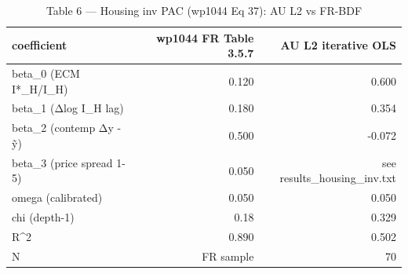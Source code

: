 \begin{table}[ht]
\centering
\caption{Table 6 — Housing inv PAC (wp1044 Eq 37): AU L2 vs FR-BDF}
\begin{tabular}{lrr}
\toprule
coefficient & wp1044 FR Table 3.5.7 & AU L2 iterative OLS \\
\midrule
beta_0 (ECM I*_H/I_H) & 0.120 & 0.600 \\
beta_1 (Δlog I_H lag) & 0.180 & 0.354 \\
beta_2 (contemp Δy - ỹ) & 0.500 & -0.072 \\
beta_3 (price spread 1-5) & 0.050 & see results_housing_inv.txt \\
omega (calibrated) & 0.050 & 0.050 \\
chi (depth-1) & ~0.18 & 0.329 \\
R^2 & 0.890 & 0.502 \\
N & FR sample & 70 \\
\bottomrule
\end{tabular}
\end{table}
